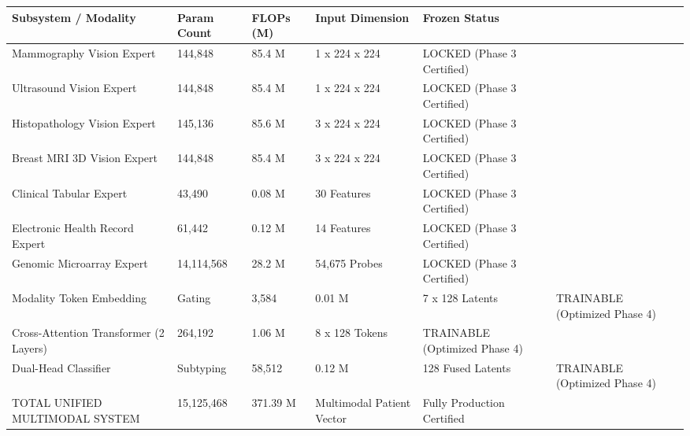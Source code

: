 \begin{tabular}{lllll}
\toprule
Subsystem / Modality & Param Count & FLOPs (M) & Input Dimension & Frozen Status \\
\midrule
Mammography Vision Expert & 144,848 & 85.4 M & 1 x 224 x 224 & LOCKED (Phase 3 Certified) \\
Ultrasound Vision Expert & 144,848 & 85.4 M & 1 x 224 x 224 & LOCKED (Phase 3 Certified) \\
Histopathology Vision Expert & 145,136 & 85.6 M & 3 x 224 x 224 & LOCKED (Phase 3 Certified) \\
Breast MRI 3D Vision Expert & 144,848 & 85.4 M & 3 x 224 x 224 & LOCKED (Phase 3 Certified) \\
Clinical Tabular Expert & 43,490 & 0.08 M & 30 Features & LOCKED (Phase 3 Certified) \\
Electronic Health Record Expert & 61,442 & 0.12 M & 14 Features & LOCKED (Phase 3 Certified) \\
Genomic Microarray Expert & 14,114,568 & 28.2 M & 54,675 Probes & LOCKED (Phase 3 Certified) \\
Modality Token Embedding & Gating & 3,584 & 0.01 M & 7 x 128 Latents & TRAINABLE (Optimized Phase 4) \\
Cross-Attention Transformer (2 Layers) & 264,192 & 1.06 M & 8 x 128 Tokens & TRAINABLE (Optimized Phase 4) \\
Dual-Head Classifier & Subtyping & 58,512 & 0.12 M & 128 Fused Latents & TRAINABLE (Optimized Phase 4) \\
TOTAL UNIFIED MULTIMODAL SYSTEM & 15,125,468 & 371.39 M & Multimodal Patient Vector & Fully Production Certified \\
\bottomrule
\end{tabular}
